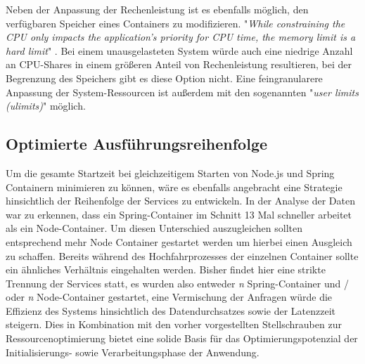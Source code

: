 Neben der Anpassung der Rechenleistung ist es ebenfalls möglich, den verfügbaren Speicher eines Containers zu modifizieren. "\emph{While constraining the CPU only impacts the application’s priority for CPU time, the memory limit is a hard limit}" \cite[Seite~68 ff.]{oreilly-docker}. Bei einem unausgelasteten System würde auch eine niedrige Anzahl an CPU-Shares in einem größeren Anteil von Rechenleistung resultieren, bei der Begrenzung des Speichers gibt es diese Option nicht. Eine feingranularere Anpassung der System-Ressourcen ist außerdem mit den sogenannten "\emph{user limits (ulimits)}" möglich.

\subsection{Optimierte Ausführungsreihenfolge}
Um die gesamte Startzeit bei gleichzeitigem Starten von Node.js und Spring Containern minimieren zu können, wäre es ebenfalls angebracht eine Strategie hinsichtlich der Reihenfolge der Services zu entwickeln. In der Analyse der Daten war zu erkennen, dass ein Spring-Container im Schnitt 13 Mal schneller arbeitet als ein Node-Container. Um diesen Unterschied auszugleichen sollten entsprechend mehr Node Container gestartet werden um hierbei einen Ausgleich zu schaffen. Bereits während des Hochfahrprozesses der einzelnen Container sollte ein ähnliches Verhältnis eingehalten werden. Bisher findet hier eine strikte Trennung der Services statt, es wurden also entweder \emph{n} Spring-Container und / oder \emph{n} Node-Container gestartet, eine Vermischung der Anfragen würde die Effizienz des Systems hinsichtlich des Datendurchsatzes sowie der Latenzzeit steigern. Dies in Kombination mit den vorher vorgestellten Stellschrauben zur Ressourcenoptimierung bietet eine solide Basis für das Optimierungspotenzial der Initialisierungs- sowie Verarbeitungsphase der Anwendung.

